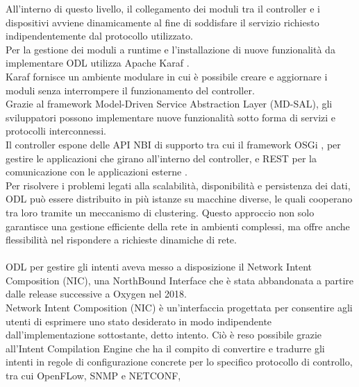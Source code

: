 All'interno di questo livello, il collegamento dei moduli tra il controller e i dispositivi avviene dinamicamente al fine di soddisfare il servizio richiesto indipendentemente dal protocollo utilizzato.
\\Per la gestione dei moduli a runtime e l'installazione di nuove funzionalità da implementare ODL utilizza Apache Karaf \cite{Apache}.
\\Karaf fornisce un ambiente modulare in cui è possibile creare e aggiornare i moduli senza interrompere il funzionamento del controller.
\\Grazie al framework Model-Driven Service Abstraction Layer (MD-SAL), gli sviluppatori possono implementare nuove funzionalità sotto forma di servizi e protocolli interconnessi.
\\Il controller espone delle API NBI di supporto tra cui il framework OSGi \cite{osgi}, per gestire le applicazioni che girano all'interno del controller,
e REST per la comunicazione con le applicazioni esterne \cite{tesiodl2}.
\\Per risolvere i problemi legati alla scalabilità, disponibilità e persistenza dei dati, ODL può essere distribuito in più istanze su macchine diverse, le quali cooperano tra loro tramite un meccanismo di clustering. 
Questo approccio non solo garantisce una gestione efficiente della rete in ambienti complessi, ma offre anche flessibilità nel rispondere a richieste dinamiche di rete. 
\\
\\ODL per gestire gli intenti aveva messo a disposizione il Network Intent Composition (NIC), una NorthBound Interface che è stata abbandonata a partire dalle release successive a Oxygen nel 2018.
\\Network Intent Composition (NIC) \cite{nic} è un'interfaccia progettata per consentire agli utenti di esprimere uno stato desiderato in modo indipendente dall'implementazione sottostante, detto intento. 
Ciò è reso possibile grazie all'Intent Compilation Engine che ha il compito di convertire e tradurre gli intenti in regole di configurazione concrete per lo specifico protocollo di controllo, tra cui OpenFLow, SNMP e NETCONF,
